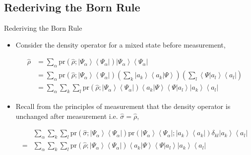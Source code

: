 \documentclass[9pt,handout]{beamer}
\newcommand{\pr}[0]{\text{pr}}
\begin{document}
\subsection{Rederiving the Born Rule}
\begin{frame}{Rederiving the Born Rule}
\begin{itemize}
\item Consider the density operator for a mixed state before measurement,

\begin{align*}
\widehat{\rho} & = \sum_\alpha \pr \left( \widehat{\rho}; \left\lvert \Psi_\alpha \right\rangle \left\langle \Psi_\alpha \right\rvert \right) \left\lvert \Psi_\alpha \right\rangle \left\langle \Psi_\alpha \right\rvert \\
& = \sum_\alpha \pr \left( \widehat{\rho}; \left\lvert \Psi_\alpha \right\rangle \left\langle \Psi_\alpha \right\rvert \right) \left( \sum_k \left\lvert a_k \right\rangle \left\langle a_k \right\rvert \left. \Psi \right\rangle \right) \left( \sum_l \left\langle \Psi \right\rvert \left. a_l \right\rangle \left\langle a_l \right\rvert \right) \\
& = \sum_\alpha \sum_k \sum_l \pr \left( \widehat{\rho}; \left\lvert \Psi_\alpha \right\rangle \left\langle \Psi_\alpha \right\rvert \right) \left\langle a_k \right\rvert \left. \Psi \right\rangle \left\langle \Psi \right\rvert \left. a_l \right\rangle \left\lvert a_k \right\rangle \left\langle a_l \right\rvert
\end{align*}

\item Recall from the principles of measurement that the density operator is unchanged after measurement i.e. $\widehat{\sigma} = \widehat{\rho}$,

\begin{align*}
& \sum_\alpha \sum_k \sum_l \pr \left( \widehat{\sigma}; \left\lvert \Psi_\alpha \right\rangle \left\langle \Psi_\alpha \right\rvert \right) \pr \left( \left\lvert \Psi_\alpha \right\rangle \left\langle \Psi_\alpha \right\rvert; \left\lvert a_k \right\rangle \left\langle a_k \right\rvert \right) \delta_{k l} \left\lvert a_k \right\rangle \left\langle a_l \right\rvert \\
= & \sum_\alpha \sum_k \sum_l \pr \left( \widehat{\rho}; \left\lvert \Psi_\alpha \right\rangle \left\langle \Psi_\alpha \right\rvert \right) \left\langle a_k \right\rvert \left. \Psi \right\rangle \left\langle \Psi \right\rvert \left. a_l \right\rangle \left\lvert a_k \right\rangle \left\langle a_l \right\rvert
\end{align*}
\end{itemize}
\end{frame}
\end{document}
